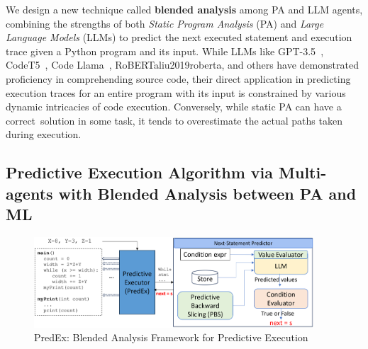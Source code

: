
We design a new technique called {\bf blended analysis} among PA and LLM
agents, combining the strengths of both {\em Static Program Analysis}
(PA) and {\em Large Language Models} (LLMs) to predict the next
executed statement and execution trace given a Python program and its
input. While LLMs like GPT-3.5~\cite{GPT3.5},
CodeT5~\cite{wang2023codet5}, Code Llama~\cite{code_llama},
RoBERTa{liu2019roberta}, and others have demonstrated proficiency in
comprehending source code, their direct application in predicting
execution traces for an entire program with its input is constrained
by various dynamic intricacies of code execution. Conversely, while
static PA can have a correct~solution in some task, it tends to
overestimate the actual paths taken during execution.

\subsection{Predictive Execution Algorithm via Multi-agents with Blended Analysis between PA and ML}

\begin{figure}
\begin{center}
\includegraphics[width=4.1in]{overview-4.png}
\vspace{-12pt}
\caption{PredEx: Blended Analysis Framework for Predictive Execution}
\label{fig:overview}
\end{center}
\end{figure}

